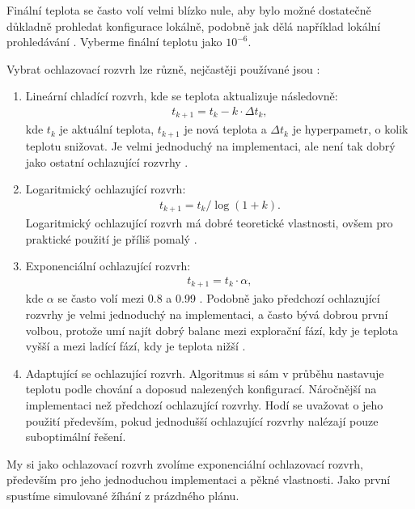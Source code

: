 Finální teplota se často volí velmi blízko nule, aby bylo možné dostatečně důkladně prohledat konfigurace lokálně, podobně jak dělá například lokální prohledávání \cite{sa_theory}.
Vyberme finální teplotu jako $10^{-6}$.

Vybrat ochlazovací rozvrh lze různě, nejčastěji používané jsou \cite{sa_theory}:
\begin{enumerate}
  \item Lineární chladící rozvrh, kde se teplota aktualizuje následovně:
    \begin{align*}
      t_{k+1} = t_k - k \cdot \Delta t_k,
    \end{align*}
    kde $t_k$ je aktuální teplota, $t_{k+1}$ je nová teplota a $\Delta t_k$ je hyperpametr, o kolik teplotu snižovat.
    Je velmi jednoduchý na implementaci, ale není tak dobrý jako ostatní ochlazující rozvrhy \cite{sa_schedules}.

  \item Logaritmický ochlazující rozvrh:
    \begin{align*}
      t_{k+1} = t_{k} / \log(1 + k).
    \end{align*}
    Logaritmický ochlazující rozvrh má dobré teoretické vlastnosti, ovšem pro praktické použití je příliš pomalý \cite{sa_schedules}.

  \item Exponenciální ochlazující rozvrh:
    \begin{align*}
      t_{k+1} = t_k \cdot \alpha,
    \end{align*}
    kde $\alpha$ se často volí mezi 0.8 a 0.99 \cite{sa_theory}.
    Podobně jako předchozí ochlazující rozvrhy je velmi jednoduchý na implementaci, a často bývá dobrou první volbou, protože umí najít dobrý balanc mezi explorační fází,
    kdy je teplota vyšší a mezi ladící fází, kdy je teplota nižší \cite{sa_theory}.

  \item Adaptující se ochlazující rozvrh. Algoritmus si sám v průběhu nastavuje teplotu podle chování a doposud nalezených konfigurací.
    Náročnější na implementaci než předchozí ochlazující rozvrhy. Hodí se uvažovat o jeho použití především, pokud jednodušší ochlazující rozvrhy nalézají pouze suboptimální řešení.
\end{enumerate}

My si jako ochlazovací rozvrh zvolíme exponenciální ochlazovací rozvrh, především pro jeho jednoduchou implementaci a pěkné vlastnosti.
Jako první spustíme simulované žíhání z prázdného plánu.

